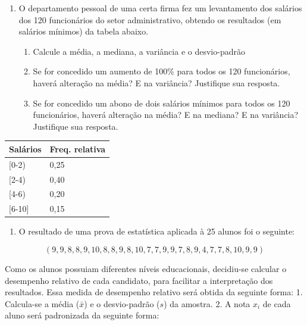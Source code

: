 \documentclass[]{article}
\providecommand{\tightlist}{%
  \setlength{\itemsep}{0pt}\setlength{\parskip}{0pt}}
\begin{document}
\begin{enumerate}
\def\labelenumi{\arabic{enumi}.}
\setcounter{enumi}{5}
\tightlist
\item
  O departamento pessoal de uma certa firma fez um levantamento dos
  salários dos 120 funcionários do setor administrativo, obtendo os
  resultados (em salários mínimos) da tabela abaixo.

  \begin{enumerate}
  \def\labelenumii{(\alph{enumii})}
  \tightlist
  \item
    Calcule a média, a mediana, a variância e o desvio-padrão
  \item
    Se for concedido um aumento de 100\% para todos os 120 funcionários,
    haverá alteração na média? E na variância? Justifique sua resposta.
  \item
    Se for concedido um abono de dois salários mínimos para todos os 120
    funcionários, haverá alteração na média? E na mediana? E na
    variância? Justifique sua resposta.
  \end{enumerate}
\end{enumerate}

\begin{table}[H]
\centering
\begin{tabular}{ll}
\hline
Salários   & Freq. relativa \\ \hline
{[}0-2)    & 0,25           \\
{[}2-4)    & 0,40           \\
{[}4-6)    & 0,20           \\
{[}6-10{]} & 0,15           \\ \hline
\end{tabular}
\end{table}

\begin{enumerate}
\def\labelenumi{\arabic{enumi}.}
\setcounter{enumi}{6}
\tightlist
\item
  O resultado de uma prova de estatística aplicada à 25 alunos foi o
  seguinte:
\end{enumerate}

\[(9, 9, 8, 8, 9, 10, 8, 8, 9, 8, 10, 7, 7, 9, 9, 7, 8, 9, 4, 7, 7, 8, 10, 9, 9)\]

Como os alunos possuiam diferentes níveis educacionais, decidiu-se
calcular o desempenho relativo de cada candidato, para facilitar a
interpretação dos resultados. Essa medida de desempenho relativo será
obtida da seguinte forma: 1. Calcula-se a média (\(\bar x\)) e o
desvio-padrão (\(s\)) da amostra. 2. A nota \(x_i\) de cada aluno será
padronizada da seguinte forma:
\end{document}
